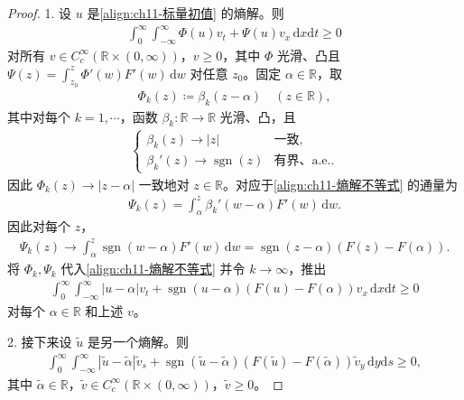 \documentclass[../../main.tex]{subfiles}
\begin{document}
\begin{proof}
1. 设 $u$ 是\eqref{align:ch11-标量初值} 的熵解。则
\begin{align}
\int_0^\infty\int_{-\infty}^\infty \Phi(u)v_t+\Psi(u)v_x\,\mathrm{d}x\mathrm{d}t\geqslant 0
\label{align:ch11-熵解不等式}
\end{align}
对所有 $v\in C_c^\infty(\mathbb{R}\times(0,\infty))$，$v\geqslant 0$，其中 $\Phi$ 光滑、凸且 $\Psi(z)=\int_{z_0}^z\Phi'(w)F'(w)\,\mathrm{d}w$ 对任意 $z_0$。固定 $\alpha\in\mathbb{R}$，取
\begin{align*}
\Phi_k(z)\coloneqq\beta_k(z-\alpha) \quad (z\in\mathbb{R}),
\end{align*}
其中对每个 $k=1,\cdots$，函数 $\beta_k:\mathbb{R}\to\mathbb{R}$ 光滑、凸，且
\begin{align*}
\begin{cases}
\beta_k(z)\to|z| & \text{一致},\\
\beta_k'(z)\to\operatorname{sgn}(z) & \text{有界、a.e.}.
\end{cases}
\end{align*}
因此 $\Phi_k(z)\to|z-\alpha|$ 一致地对 $z\in\mathbb{R}$。对应于\eqref{align:ch11-熵解不等式} 的通量为
\begin{align*}
\Psi_k(z)=\int_\alpha^z\beta_k'(w-\alpha)F'(w)\,\mathrm{d}w.
\end{align*}
因此对每个 $z$，
\begin{align*}
\Psi_k(z)\to\int_\alpha^z\operatorname{sgn}(w-\alpha)F'(w)\,\mathrm{d}w=\operatorname{sgn}(z-\alpha)(F(z)-F(\alpha)).
\end{align*}
将 $\Phi_k,\Psi_k$ 代入\eqref{align:ch11-熵解不等式} 并令 $k\to\infty$，推出
\begin{align}
\int_0^\infty\int_{-\infty}^\infty |u-\alpha|v_t+\operatorname{sgn}(u-\alpha)(F(u)-F(\alpha))v_x\,\mathrm{d}x\mathrm{d}t\geqslant 0
\label{align:ch11-Kruzhkov不等式}
\end{align}
对每个 $\alpha\in\mathbb{R}$ 和上述 $v$。

2. 接下来设 $\widetilde{u}$ 是另一个熵解。则
\begin{align*}
\int_0^\infty\int_{-\infty}^\infty |\widetilde{u}-\widetilde{\alpha}|\widetilde{v}_s+\operatorname{sgn}(\widetilde{u}-\widetilde{\alpha})(F(\widetilde{u})-F(\widetilde{\alpha}))\widetilde{v}_y\,\mathrm{d}y\mathrm{d}s\geqslant 0,
\end{align*}
其中 $\widetilde{\alpha}\in\mathbb{R}$，$\widetilde{v}\in C_c^\infty(\mathbb{R}\times(0,\infty))$，$\widetilde{v}\geqslant 0$。


\end{proof}
\end{document}
